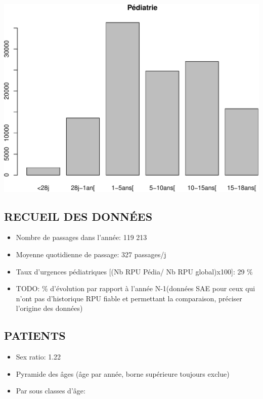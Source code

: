 \documentclass[]{article}
\begin{document}
\includegraphics{rapport2014_V4_files/figure-latex/pop18-1.pdf}

\subsection{RECUEIL DES DONNÉES}\label{recueil-des-donnees-1}

\begin{itemize}
\itemsep1pt\parskip0pt
\item
  Nombre de passages dans l'année: 119 213
\item
  Moyenne quotidienne de passage: 327 passages/j
\item
  Taux d'urgences pédiatriques {[}(Nb RPU Pédia/ Nb RPU global)x100{]}:
  29 \%
\item
  TODO: \% d'évolution par rapport à l'année N-1(données SAE pour ceux
  qui n'ont pas d'historique RPU fiable et permettant la comparaison,
  préciser l'origine des données)
\end{itemize}

\subsection{PATIENTS}\label{patients-1}

\begin{itemize}
\itemsep1pt\parskip0pt
\item
  Sex ratio: 1.22
\item
  Pyramide des âges (âge par année, borne supérieure toujours exclue)
\item
  Par sous classes d'âge:
\end{itemize}
\end{document}
